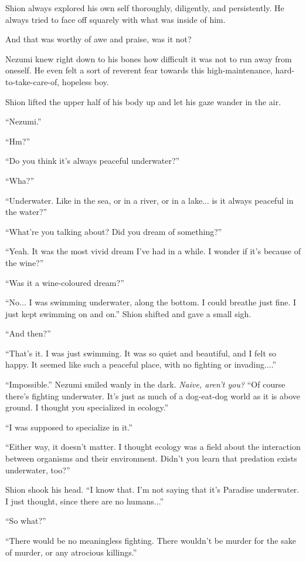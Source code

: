 Shion always explored his own self thoroughly, diligently, and
persistently. He always tried to face off squarely with what was inside
of him.

And that was worthy of awe and praise, was it not?

Nezumi knew right down to his bones how difficult it was not to run away
from oneself. He even felt a sort of reverent fear towards this
high-maintenance, hard-to-take-care-of, hopeless boy.

Shion lifted the upper half of his body up and let his gaze wander in
the air.

``Nezumi.''

``Hm?''

``Do you think it's always peaceful underwater?''

``Wha?''

``Underwater. Like in the sea, or in a river, or in a lake... is it
always peaceful in the water?''

``What're you talking about? Did you dream of something?''

``Yeah. It was the most vivid dream I've had in a while. I wonder if
it's because of the wine?''

``Was it a wine-coloured dream?''

``No... I was swimming underwater, along the bottom. I could breathe
just fine. I just kept swimming on and on.'' Shion shifted and gave a
small sigh.

``And then?''

``That's it. I was just swimming. It was so quiet and beautiful, and I
felt so happy. It seemed like such a peaceful place, with no fighting or
invading....''

``Impossible.'' Nezumi smiled wanly in the dark. \emph{Naive, aren't you?}
``Of course there's fighting underwater. It's just as much of a
dog-eat-dog world as it is above ground. I thought you specialized in
ecology.''

``I was supposed to specialize in it.''

``Either way, it doesn't matter. I thought ecology was a field about the
interaction between organisms and their environment. Didn't you learn
that predation exists underwater, too?''

Shion shook his head. ``I know that. I'm not saying that it's Paradise
underwater. I just thought, since there are no humans...''

``So what?''

``There would be no meaningless fighting. There wouldn't be murder for
the sake of murder, or any atrocious killings.''

